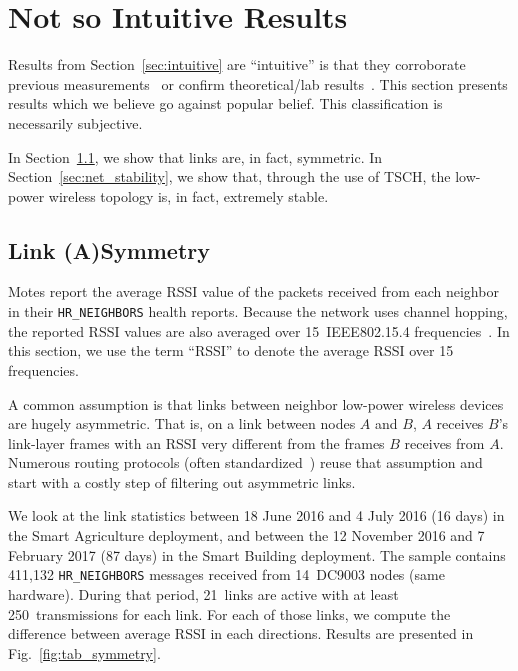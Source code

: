 \documentclass{elsarticle}
\newcommand{\building}            {Smart Building\xspace}
\newcommand{\agri}                {Smart Agriculture\xspace}
\newcommand{\HRNEIGHBORS}         {{\tt HR\_NEIGHBORS}\xspace}
\begin{document}
\section{Not so Intuitive Results}
\label{sec:notsointuitive}

Results from Section~\ref{sec:intuitive} are ``intuitive'' is that they corroborate previous measurements~\cite{watteyne16peach} or confirm theoretical/lab results~\cite{watteyne10mitigating,watteyne09reliability,watteyne15industrial}.
This section presents results which we believe go against popular belief.
This classification is necessarily subjective.

In Section~\ref{sec:symmetry}, we show that links are, in fact, symmetric.
In Section~\ref{sec:net_stability}, we show that, through the use of TSCH, the low-power wireless topology is, in fact, extremely stable.

\subsection{Link (A)Symmetry}
\label{sec:symmetry}


Motes report the average RSSI value of the packets received from each neighbor in their \HRNEIGHBORS health reports.
Because the network uses channel hopping, the reported RSSI values are also averaged over 15~IEEE802.15.4 frequencies~\cite{std_ieee802154_2015}.
In this section, we use the term ``RSSI'' to denote the average RSSI over 15 frequencies.


A common assumption is that links between neighbor low-power wireless devices are hugely asymmetric.
That is, on a link between nodes $A$ and $B$, $A$ receives $B$'s link-layer frames with an RSSI very different from the frames $B$ receives from $A$.
Numerous routing protocols (often standardized~\cite{rfc3626}) reuse that assumption and start with a costly step of filtering out asymmetric links.


We look at the link statistics between 18 June 2016 and 4 July 2016 (16 days) in the \agri deployment, and between the 12 November 2016 and 7 February 2017 (87 days) in the \building deployment.
The sample contains 411,132 \HRNEIGHBORS messages received from 14~DC9003 nodes (same hardware).
During that period, 21~links are active with at least 250~transmissions for each link.
For each of those links, we compute the difference between average RSSI in each directions.
Results are presented in Fig.~\ref{fig:tab_symmetry}.
\end{document}
